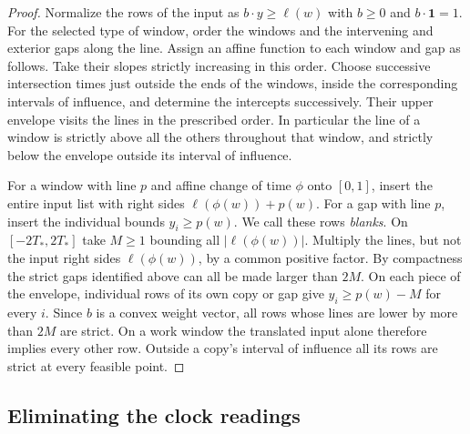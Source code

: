 \begin{proof}
Normalize the rows of the input as \(b\cdot y\ge\ell(w)\) with
\(b\ge0\) and \(b\cdot\mathbf1=1\). For the selected type of window,
order the windows and the intervening and exterior gaps along the line.
Assign an affine function to each window and gap as follows. Take their
slopes strictly increasing in this order. Choose successive intersection
times just outside the ends of the windows, inside the corresponding
intervals of influence, and determine the intercepts successively.
Their upper envelope visits the lines in the prescribed order. In
particular the line of a window is strictly above all the others
throughout that window, and strictly below the envelope outside its
interval of influence.

For a window with line \(p\) and affine change of time \(\phi\) onto
\([0,1]\), insert the entire input list with right sides
\(\ell(\phi(w))+p(w)\). For a gap with line \(p\), insert the individual
bounds \(y_i\ge p(w)\). We call these rows \emph{blanks}. On
\([-2T_*,2T_*]\) take \(M\ge1\) bounding all
\(\lvert\ell(\phi(w))\rvert\). Multiply the lines, but not the input
right sides \(\ell(\phi(w))\), by a common positive factor. By
compactness the strict gaps identified above can all be made larger
than \(2M\). On each piece of the envelope, individual rows of its own
copy or gap give \(y_i\ge p(w)-M\) for every \(i\). Since \(b\) is
a convex weight vector, all rows whose lines are lower by more than
\(2M\) are strict. On a work window the translated input alone
therefore implies every other row. Outside a copy's interval of
influence all its rows are strict at every feasible point.
\end{proof}

\subsection{Eliminating the clock readings}

